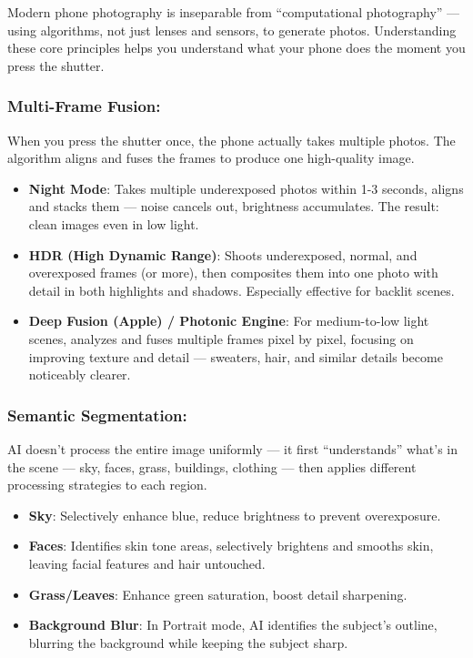 
Modern phone photography is inseparable from “computational photography” — using algorithms, not just lenses and sensors, to generate photos. Understanding these core principles helps you understand what your phone does the moment you press the shutter.

\subsubsection*{Multi-Frame Fusion:}

When you press the shutter once, the phone actually takes multiple photos. The algorithm aligns and fuses the frames to produce one high-quality image.

\begin{itemize}
  \item \textbf{Night Mode}: Takes multiple underexposed photos within 1-3 seconds, aligns and stacks them — noise cancels out, brightness accumulates. The result: clean images even in low light.
  \item \textbf{HDR (High Dynamic Range)}: Shoots underexposed, normal, and overexposed frames (or more), then composites them into one photo with detail in both highlights and shadows. Especially effective for backlit scenes.
  \item \textbf{Deep Fusion (Apple) / Photonic Engine}: For medium-to-low light scenes, analyzes and fuses multiple frames pixel by pixel, focusing on improving texture and detail — sweaters, hair, and similar details become noticeably clearer.
\end{itemize}

\subsubsection*{Semantic Segmentation:}

AI doesn't process the entire image uniformly — it first “understands” what's in the scene — sky, faces, grass, buildings, clothing — then applies different processing strategies to each region.

\begin{itemize}
  \item \textbf{Sky}: Selectively enhance blue, reduce brightness to prevent overexposure.
  \item \textbf{Faces}: Identifies skin tone areas, selectively brightens and smooths skin, leaving facial features and hair untouched.
  \item \textbf{Grass/Leaves}: Enhance green saturation, boost detail sharpening.
  \item \textbf{Background Blur}: In Portrait mode, AI identifies the subject's outline, blurring the background while keeping the subject sharp.
\end{itemize}

